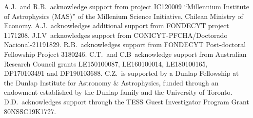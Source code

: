 \documentclass[12pt,twocolumn,tighten]{aastex63}
\begin{document}
A.J.\ and R.B.\ acknowledge support from project IC120009 ``Millennium
Institute of Astrophysics (MAS)'' of the Millenium Science Initiative,
Chilean Ministry of Economy. A.J.\ acknowledges additional support
from FONDECYT project 1171208.  J.I.V\ acknowledges support from
CONICYT-PFCHA/Doctorado Nacional-21191829.  R.B.\ acknowledges support
from FONDECYT Post-doctoral Fellowship Project 3180246.
%
C.T.\ and C.B\ acknowledge support from Australian Research Council
grants LE150100087, LE160100014, LE180100165, DP170103491 and
DP190103688.
%
C.Z.\ is supported by a Dunlap Fellowship at the Dunlap Institute for
Astronomy \& Astrophysics, funded through an endowment established by
the Dunlap family and the University of Toronto.
%
D.D.\ acknowledges support through the TESS Guest Investigator Program
Grant 80NSSC19K1727.
%
%
%
%
%
%
\end{document}
